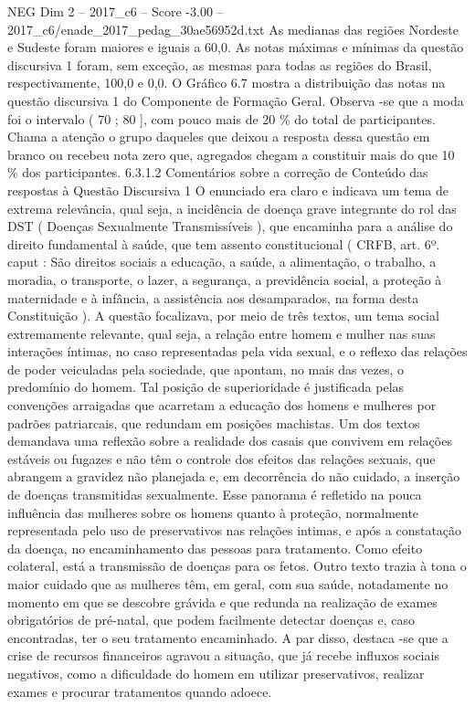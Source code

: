 \begin{textsample}{NEG Dim 2 – 2017\_c6 – Score -3.00 – 2017\_c6/enade\_2017\_pedag\_30ae56952d.txt}
As medianas das regiões Nordeste e Sudeste foram maiores e iguais a 60,0.
As notas máximas e mínimas da questão discursiva 1 foram, sem exceção, as mesmas para todas as regiões do Brasil, respectivamente, 100,0 e 0,0.
O Gráfico 6.7 mostra a distribuição das notas na questão discursiva 1 do Componente de Formação Geral.
Observa -se que a moda foi o intervalo ( 70 ; 80 ], com pouco mais de 20 \% do total de participantes.
Chama a atenção o grupo daqueles que deixou a resposta dessa questão em branco ou recebeu nota zero que, agregados chegam a constituir mais do que 10 \% dos participantes. 6.3.1.2 Comentários sobre a correção de Conteúdo das respostas à Questão Discursiva 1 O enunciado era claro e indicava um tema de extrema relevância, qual seja, a incidência de doença grave integrante do rol das DST ( Doenças Sexualmente Transmissíveis ), que encaminha para a análise do direito fundamental à saúde, que tem assento constitucional ( CRFB, art. 6º. caput : São direitos sociais a educação, a saúde, a alimentação, o trabalho, a moradia, o transporte, o lazer, a segurança, a previdência social, a proteção à maternidade e à infância, a assistência aos desamparados, na forma desta Constituição ).
A questão focalizava, por meio de três textos, um tema social extremamente relevante, qual seja, a relação entre homem e mulher nas suas interações íntimas, no caso representadas pela vida sexual, e o reflexo das relações de poder veiculadas pela sociedade, que apontam, no mais das vezes, o predomínio do homem.
Tal posição de superioridade é justificada pelas convenções arraigadas que acarretam a educação dos homens e mulheres por padrões patriarcais, que redundam em posições machistas.
Um dos textos demandava uma reflexão sobre a realidade dos casais que convivem em relações estáveis ou fugazes e não têm o controle dos efeitos das relações sexuais, que abrangem a gravidez não planejada e, em decorrência do não cuidado, a inserção de doenças transmitidas sexualmente.
Esse panorama é refletido na pouca influência das mulheres sobre os homens quanto à proteção, normalmente representada pelo uso de preservativos nas relações intimas, e após a constatação da doença, no encaminhamento das pessoas para tratamento.
Como efeito colateral, está a transmissão de doenças para os fetos.
Outro texto trazia à tona o maior cuidado que as mulheres têm, em geral, com sua saúde, notadamente no momento em que se descobre grávida e que redunda na realização de exames obrigatórios de pré-natal, que podem facilmente detectar doenças e, caso encontradas, ter o seu tratamento encaminhado.
A par disso, destaca -se que a crise de recursos financeiros agravou a situação, que já recebe influxos sociais negativos, como a dificuldade do homem em utilizar preservativos, realizar exames e procurar tratamentos quando adoece.

\end{textsample}
